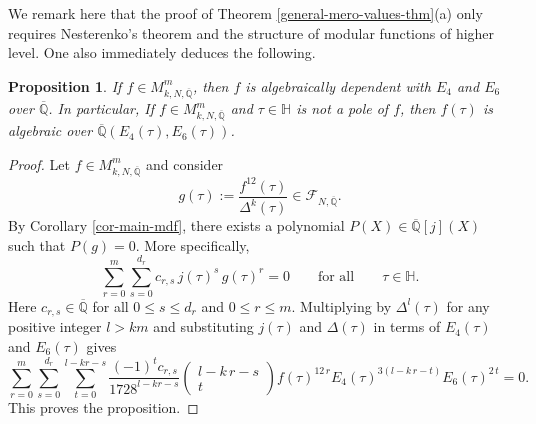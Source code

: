 \documentclass[11pt, reqno]{amsart}
\newtheorem{prop}[theorem]{Proposition}
\begin{document}
We remark here that the proof of Theorem \ref{general-mero-values-thm}(a) only requires Nesterenko's theorem and the structure of modular functions of higher level. One also immediately deduces the following. 
\begin{prop}\label{algi-cor}
If $f\in M^m_{k,N,\overline{\mathbb{Q}}}$, then $f$ is algebraically dependent with $E_4$ and $E_6$ over $\overline{\mathbb{Q}}$. In particular, If $f\in M_{k,N,\overline{\mathbb{Q}}}^m$ and $\tau\in\mathbb{H}$ is not a pole of $f$, then $f(\tau)$ is algebraic over $\overline{\mathbb{Q}}(E_4(\tau),E_6(\tau))$. 
\end{prop}
\begin{proof}
Let $f \in M^m_{k,N,\overline{\mathbb{Q}}}$ and consider 
\begin{equation*}
    g (\tau) := \frac{f^{12}(\tau)}{\Delta^k(\tau)} \in \mathcal{F}_{N,\overline{\mathbb{Q}}}.
\end{equation*}
By Corollary \ref{cor-main-mdf}, there exists a polynomial $P(X) \in \overline{\mathbb{Q}}[j](X)$ such that $P(g) = 0$. More specifically,
$$\sum_{r=0}^m \sum_{s=0}^{d_r} c_{r,s} \, {j(\tau)}^s \,{g(\tau)}^r= 0 \qquad \text{for all} \qquad \tau \in \mathbb{H}.$$
Here $c_{r,s} \in \overline{\mathbb{Q}}$ for all $0 \leq s \leq d_r$ and $0 \leq r \leq m$. Multiplying by $\Delta^l(\tau)$ for any positive integer $l > km$ and substituting $j(\tau)$ and $\Delta(\tau)$ in terms of $E_4(\tau)$ and $E_6(\tau)$ gives
\begin{equation*} 
\sum_{r=0}^m \sum_{s=0}^{d_r} \sum_{t=0}^{l-k r-s} \frac{(-1)^t c_{r, s}}{1728^{l-k r-s}}\left(\begin{array}{c}
l-k\,r-s \\
t
\end{array}\right) f(\tau)^{12\, r} E_4(\tau)^{3(l-k\, r-t)} E_6(\tau)^{2\, t}=0.   
\end{equation*}
This proves the proposition.
\end{proof}
\end{document}
